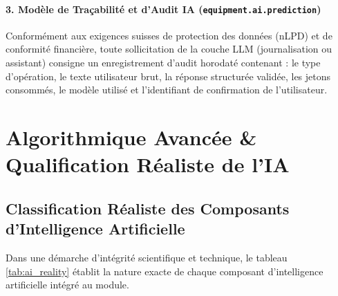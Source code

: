 \paragraph{3. Modèle de Traçabilité et d'Audit IA (\texttt{equipment.ai.prediction})}
Conformément aux exigences suisses de protection des données (nLPD) et de conformité financière, toute sollicitation de la couche LLM (journalisation ou assistant) consigne un enregistrement d'audit horodaté contenant : le type d'opération, le texte utilisateur brut, la réponse structurée validée, les jetons consommés, le modèle utilisé et l'identifiant de confirmation de l'utilisateur.

\section{Algorithmique Avancée \& Qualification Réaliste de l'IA}

\subsection{Classification Réaliste des Composants d'Intelligence Artificielle}
Dans une démarche d'intégrité scientifique et technique, le tableau \ref{tab:ai_reality} établit la nature exacte de chaque composant d'intelligence artificielle intégré au module.

